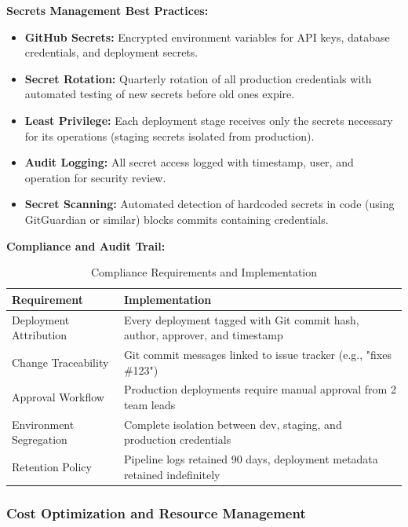 \documentclass[12pt,a4paper]{article}
\begin{document}
\textbf{Secrets Management Best Practices:}

\begin{itemize}[leftmargin=2em, itemsep=6pt]
    \item \textbf{GitHub Secrets:} Encrypted environment variables for API keys, database credentials, and deployment secrets.
    \item \textbf{Secret Rotation:} Quarterly rotation of all production credentials with automated testing of new secrets before old ones expire.
    \item \textbf{Least Privilege:} Each deployment stage receives only the secrets necessary for its operations (staging secrets isolated from production).
    \item \textbf{Audit Logging:} All secret access logged with timestamp, user, and operation for security review.
    \item \textbf{Secret Scanning:} Automated detection of hardcoded secrets in code (using GitGuardian or similar) blocks commits containing credentials.
\end{itemize}

\vspace{0.5em}

\textbf{Compliance and Audit Trail:}

\begin{table}[H]
\centering
\begin{tabular}{|p{5cm}|p{8cm}|}
\hline
\textbf{Requirement} & \textbf{Implementation} \\
\hline
Deployment Attribution & Every deployment tagged with Git commit hash, author, approver, and timestamp \\
\hline
Change Traceability & Git commit messages linked to issue tracker (e.g., "fixes \#123") \\
\hline
Approval Workflow & Production deployments require manual approval from 2 team leads \\
\hline
Environment Segregation & Complete isolation between dev, staging, and production credentials \\
\hline
Retention Policy & Pipeline logs retained 90 days, deployment metadata retained indefinitely \\
\hline
\end{tabular}
\caption{Compliance Requirements and Implementation}
\end{table}

\subsubsection{Cost Optimization and Resource Management}
\end{document}
